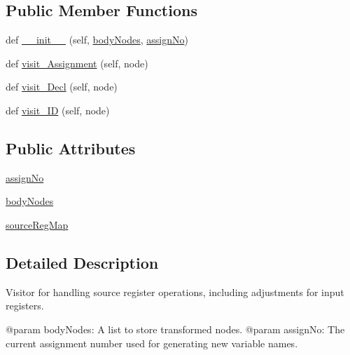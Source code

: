 \subsection*{Public Member Functions}
\begin{DoxyCompactItemize}
\item 
def \hyperlink{classPostProcessor_1_1Visitor_1_1SourceRegHandler_a3328eb3718a1907a8a24087b075a2062}{\+\_\+\+\_\+init\+\_\+\+\_\+} (self, \hyperlink{classPostProcessor_1_1Visitor_1_1SourceRegHandler_afde190707204b09a99ff642a6afa5695}{body\+Nodes}, \hyperlink{classPostProcessor_1_1Visitor_1_1SourceRegHandler_a58eaabd0374c4bb1e31a844d27cc020e}{assign\+No})
\item 
def \hyperlink{classPostProcessor_1_1Visitor_1_1SourceRegHandler_adae6ad6f5b94c4acd95924bb3df9ebc8}{visit\+\_\+\+Assignment} (self, node)
\item 
def \hyperlink{classPostProcessor_1_1Visitor_1_1SourceRegHandler_a6568bead87923bbcaa593e5f226920f0}{visit\+\_\+\+Decl} (self, node)
\item 
def \hyperlink{classPostProcessor_1_1Visitor_1_1SourceRegHandler_a876b22ca4502c2197e9881ebf8fb6288}{visit\+\_\+\+ID} (self, node)
\end{DoxyCompactItemize}
\subsection*{Public Attributes}
\begin{DoxyCompactItemize}
\item 
\hyperlink{classPostProcessor_1_1Visitor_1_1SourceRegHandler_a58eaabd0374c4bb1e31a844d27cc020e}{assign\+No}
\item 
\hyperlink{classPostProcessor_1_1Visitor_1_1SourceRegHandler_afde190707204b09a99ff642a6afa5695}{body\+Nodes}
\item 
\hyperlink{classPostProcessor_1_1Visitor_1_1SourceRegHandler_a5335ddea83c9830542ef485915e73445}{source\+Reg\+Map}
\end{DoxyCompactItemize}


\subsection{Detailed Description}
\begin{DoxyVerb}Visitor for handling source register operations, including adjustments for input registers.

@param bodyNodes: A list to store transformed nodes.
@param assignNo: The current assignment number used for generating new variable names.
\end{DoxyVerb}
 

